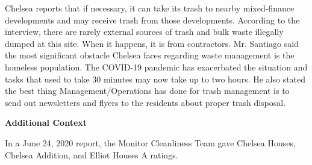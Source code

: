 Chelsea reports that if necessary, it can take its trash to nearby mixed-finance developments and may receive trash from those developments. According to the interview, there are rarely external sources of trash and bulk waste illegally dumped at this site. When it happens, it is from contractors. Mr. Santiago said the most significant obstacle Chelsea faces regarding waste management is the homeless population. The COVID-19 pandemic has exacerbated the situation and tasks that used to take 30 minutes may now take up to two hours. He also stated the best thing Management/Operations has done for trash management is to send out newsletters and flyers to the residents about proper trash disposal.  

\textbf{Additional Context}  

In a June 24, 2020 report, the Monitor Cleanliness Team gave Chelsea Houses, Chelsea Addition, and Elliot Houses A ratings. 

 